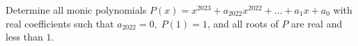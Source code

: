 Determine all monic polynomials $P(x) = x^{2023}+a_{2022}x^{2022} + \dots +a_1x + a_0$ with
real coefficients such that $a_{2022} = 0, \; P(1) = 1$, and all roots of $P$ are real and less than $1$.

